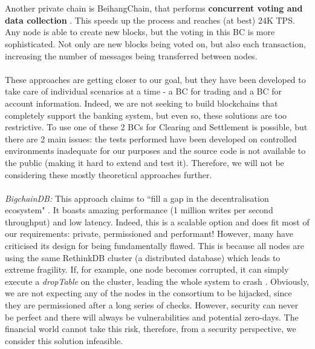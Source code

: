 \documentclass[12pt,twoside]{article}
\begin{document}
\\ \\
Another private chain is BeihangChain, that performs \textbf{concurrent voting and data collection} \cite{Chinese}. This speeds up the process and reaches (at best) 24K TPS. Any node is able to create new blocks, but the voting in this BC is more sophisticated. Not only are new blocks being voted on, but also each transaction, increasing the number of messages being transferred between nodes.
\\ \\
These approaches are getting closer to our goal, but they have been developed to take care of individual scenarios at a time - a BC for trading and a BC for account information. Indeed, we are not seeking to build blockchains that completely support the banking system, but even so, these solutions are too restrictive. To use one of these 2 BCs for Clearing and Settlement is possible, but there are 2 main issues: the tests performed have been developed on controlled environments inadequate for our purposes and the source code is not available to the public (making it hard to extend and test it). Therefore, we will not be considering these mostly theoretical approaches further.
\\ \\
\textit{BigchainDB:} This approach claims to ``fill a gap in the decentralisation ecosystem" \cite{DBC}. It boasts amazing performance (1 million writes per second throughput) and low latency. Indeed, this is a scalable option and does fit most of our requirements: private, permissioned and performant! However, many have criticised its design for being fundamentally flawed. This is because all nodes are using the same RethinkDB cluster (a distributed database) which leads to extreme fragility. If, for example, one node becomes corrupted, it can simply execute a \textit{dropTable} on the cluster, leading the whole system to crash \cite{Sewer}. Obviously, we are not expecting any of the nodes in the consortium to be hijacked, since they are permissioned after a long series of checks. However, security can never be perfect and there will always be vulnerabilities and potential zero-days. The financial world cannot take this risk, therefore, from a security perspective, we consider this solution infeasible.
\end{document}
